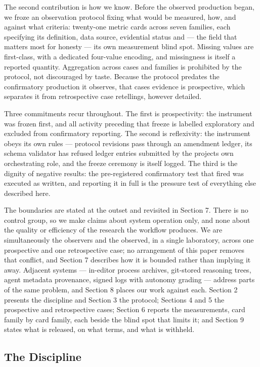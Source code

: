 \documentclass[
  english,
]{article}
\begin{document}
The second contribution is how we know. Before the observed production began, we froze an observation protocol fixing what would be measured, how, and against what criteria: twenty-one metric cards across seven families, each specifying its definition, data source, evidential status and --- the field that matters most for honesty --- its own measurement blind spot. Missing values are first-class, with a dedicated four-value encoding, and missingness is itself a reported quantity. Aggregation across cases and families is prohibited by the protocol, not discouraged by taste. Because the protocol predates the confirmatory production it observes, that case\textquotesingle s evidence is prospective, which separates it from retrospective case retellings, however detailed.

Three commitments recur throughout. The first is prospectivity: the instrument was frozen first, and all activity preceding that freeze is labelled exploratory and excluded from confirmatory reporting. The second is reflexivity: the instrument obeys its own rules --- protocol revisions pass through an amendment ledger, its schema validator has refused ledger entries submitted by the project\textquotesingle s own orchestrating role, and the freeze ceremony is itself logged. The third is the dignity of negative results: the pre-registered confirmatory test that fired was executed as written, and reporting it in full is the pressure test of everything else described here.

The boundaries are stated at the outset and revisited in Section 7. There is no control group, so we make claims about system operation only, and none about the quality or efficiency of the research the workflow produces. We are simultaneously the observers and the observed, in a single laboratory, across one prospective and one retrospective case; no arrangement of this paper removes that conflict, and Section 7 describes how it is bounded rather than implying it away. Adjacent systems --- in-editor process archives, git-stored reasoning trees, agent metadata provenance, signed logs with autonomy grading --- address parts of the same problem, and Section 8 places our work against each. Section 2 presents the discipline and Section 3 the protocol; Sections 4 and 5 the prospective and retrospective cases; Section 6 reports the measurements, card family by card family, each beside the blind spot that limits it; and Section 9 states what is released, on what terms, and what is withheld.

\subsection{The Discipline}\label{the-discipline}
\end{document}
